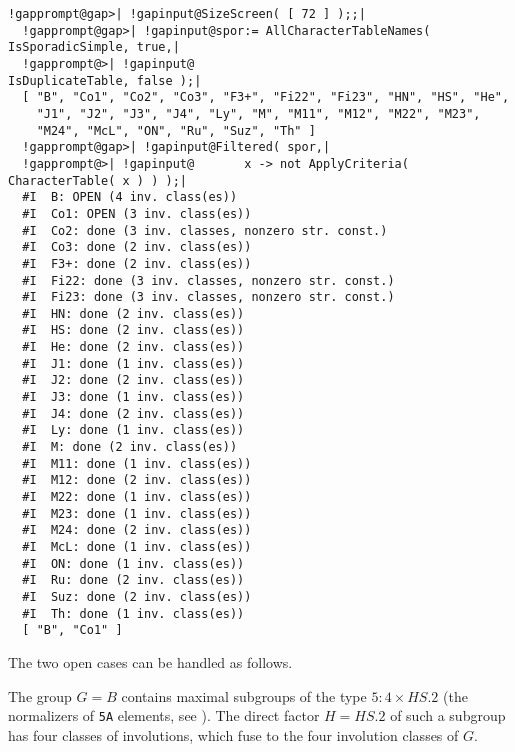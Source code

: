\documentclass[a4paper,11pt]{report}
\begin{document}
{{{ 
\begin{Verbatim}[commandchars=!@|,fontsize=\small,frame=single,label=Example]
  !gapprompt@gap>| !gapinput@SizeScreen( [ 72 ] );;|
  !gapprompt@gap>| !gapinput@spor:= AllCharacterTableNames( IsSporadicSimple, true,|
  !gapprompt@>| !gapinput@                                  IsDuplicateTable, false );|
  [ "B", "Co1", "Co2", "Co3", "F3+", "Fi22", "Fi23", "HN", "HS", "He", 
    "J1", "J2", "J3", "J4", "Ly", "M", "M11", "M12", "M22", "M23", 
    "M24", "McL", "ON", "Ru", "Suz", "Th" ]
  !gapprompt@gap>| !gapinput@Filtered( spor,|
  !gapprompt@>| !gapinput@       x -> not ApplyCriteria( CharacterTable( x ) ) );|
  #I  B: OPEN (4 inv. class(es))
  #I  Co1: OPEN (3 inv. class(es))
  #I  Co2: done (3 inv. classes, nonzero str. const.)
  #I  Co3: done (2 inv. class(es))
  #I  F3+: done (2 inv. class(es))
  #I  Fi22: done (3 inv. classes, nonzero str. const.)
  #I  Fi23: done (3 inv. classes, nonzero str. const.)
  #I  HN: done (2 inv. class(es))
  #I  HS: done (2 inv. class(es))
  #I  He: done (2 inv. class(es))
  #I  J1: done (1 inv. class(es))
  #I  J2: done (2 inv. class(es))
  #I  J3: done (1 inv. class(es))
  #I  J4: done (2 inv. class(es))
  #I  Ly: done (1 inv. class(es))
  #I  M: done (2 inv. class(es))
  #I  M11: done (1 inv. class(es))
  #I  M12: done (2 inv. class(es))
  #I  M22: done (1 inv. class(es))
  #I  M23: done (1 inv. class(es))
  #I  M24: done (2 inv. class(es))
  #I  McL: done (1 inv. class(es))
  #I  ON: done (1 inv. class(es))
  #I  Ru: done (2 inv. class(es))
  #I  Suz: done (2 inv. class(es))
  #I  Th: done (1 inv. class(es))
  [ "B", "Co1" ]
\end{Verbatim}
 

 The two open cases can be handled as follows. 

 The group $G = B$ contains maximal subgroups of the type $5:4 \times HS.2$ (the normalizers of \texttt{5A} elements, see \cite[p.{\nobreakspace}217]{CCN85}). The direct factor $H = HS.2$ of such a subgroup has four classes of involutions, which fuse to the four
involution classes of $G$. 

}}}
\end{document}
